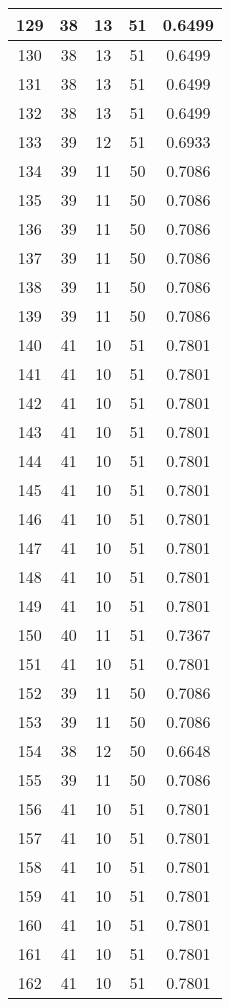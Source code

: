 \documentclass[letterpaper, 12pt]{article}
\begin{document}
\begin{longtable}{|c|c|c|c|c|}
\hline
129 & 38 & 13 & 51 & 0.6499 \\
\hline
130 & 38 & 13 & 51 & 0.6499 \\
\hline
131 & 38 & 13 & 51 & 0.6499 \\
\hline
132 & 38 & 13 & 51 & 0.6499 \\
\hline
133 & 39 & 12 & 51 & 0.6933 \\
\hline
134 & 39 & 11 & 50 & 0.7086 \\
\hline
135 & 39 & 11 & 50 & 0.7086 \\
\hline
136 & 39 & 11 & 50 & 0.7086 \\
\hline
137 & 39 & 11 & 50 & 0.7086 \\
\hline
138 & 39 & 11 & 50 & 0.7086 \\
\hline
139 & 39 & 11 & 50 & 0.7086 \\
\hline
140 & 41 & 10 & 51 & 0.7801 \\
\hline
141 & 41 & 10 & 51 & 0.7801 \\
\hline
142 & 41 & 10 & 51 & 0.7801 \\
\hline
143 & 41 & 10 & 51 & 0.7801 \\
\hline
144 & 41 & 10 & 51 & 0.7801 \\
\hline
145 & 41 & 10 & 51 & 0.7801 \\
\hline
146 & 41 & 10 & 51 & 0.7801 \\
\hline
147 & 41 & 10 & 51 & 0.7801 \\
\hline
148 & 41 & 10 & 51 & 0.7801 \\
\hline
149 & 41 & 10 & 51 & 0.7801 \\
\hline
150 & 40 & 11 & 51 & 0.7367 \\
\hline
151 & 41 & 10 & 51 & 0.7801 \\
\hline
152 & 39 & 11 & 50 & 0.7086 \\
\hline
153 & 39 & 11 & 50 & 0.7086 \\
\hline
154 & 38 & 12 & 50 & 0.6648 \\
\hline
155 & 39 & 11 & 50 & 0.7086 \\
\hline
156 & 41 & 10 & 51 & 0.7801 \\
\hline
157 & 41 & 10 & 51 & 0.7801 \\
\hline
158 & 41 & 10 & 51 & 0.7801 \\
\hline
159 & 41 & 10 & 51 & 0.7801 \\
\hline
160 & 41 & 10 & 51 & 0.7801 \\
\hline
161 & 41 & 10 & 51 & 0.7801 \\
\hline
162 & 41 & 10 & 51 & 0.7801 \\

\end{longtable}
\end{document}
